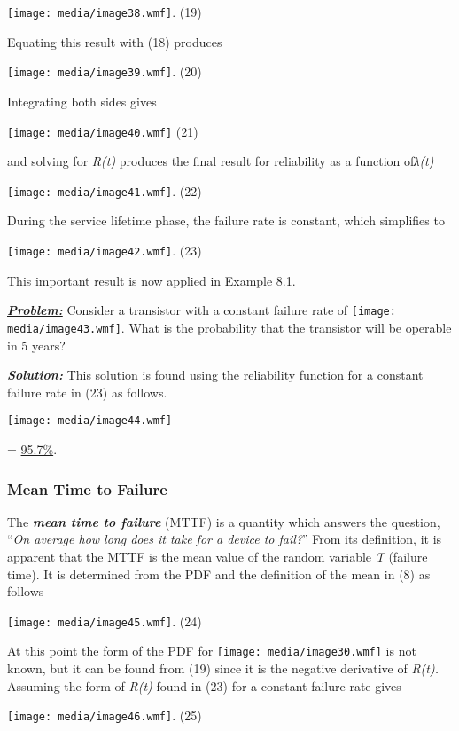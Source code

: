 \texttt{[image: media/image38.wmf]}. (19)

Equating this result with (18) produces

\texttt{[image: media/image39.wmf]}. (20)

Integrating both sides gives

\texttt{[image: media/image40.wmf]} (21)

and solving for \emph{R(t)} produces the final result for reliability as
a function of\emph{λ(t)}

\texttt{[image: media/image41.wmf]}. (22)

During the service lifetime phase, the failure rate is constant, which
simplifies to

\texttt{[image: media/image42.wmf]}. (23)

This important result is now applied in Example 8.1.

\emph{\textbf{\ul{Problem:}}} Consider a transistor with a constant
failure rate of \texttt{[image: media/image43.wmf]}. What is the
probability that the transistor will be operable in 5 years?

\emph{\textbf{\ul{Solution:}}} This solution is found using the
reliability function for a constant failure rate in (23) as follows.

\texttt{[image: media/image44.wmf]}

= \ul{95.7\%}.

\subsubsection{\texorpdfstring{\hfill\break
Mean Time to
Failure}{ Mean Time to Failure}}\label{mean-time-to-failure}

The \emph{\textbf{mean time to failure}} (MTTF) is a quantity which
answers the question, ``\emph{On average how long does it take for a
device to fail?}'' From its definition, it is apparent that the MTTF is
the mean value of the random variable \emph{T} (failure time). It is
determined from the PDF and the definition of the mean in (8) as follows

\texttt{[image: media/image45.wmf]}. (24)

At this point the form of the PDF for
\texttt{[image: media/image30.wmf]} is not known, but it can be found
from (19) since it is the negative derivative of \emph{R(t).} Assuming
the form of \emph{R(t)} found in (23) for a constant failure rate gives

\texttt{[image: media/image46.wmf]}. (25)

